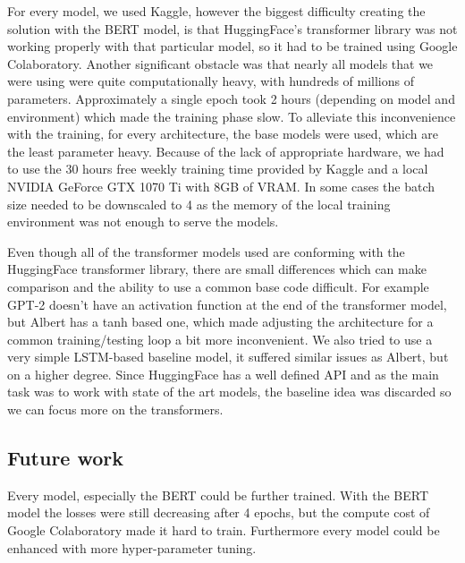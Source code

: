\documentclass[runningheads]{llncs}
\begin{document}
For every model, we used Kaggle, however the biggest difficulty creating the solution with the BERT model, is that HuggingFace's transformer library was not working properly with that particular model, so it had to be trained using Google Colaboratory. Another significant obstacle was that nearly all models that we were using were quite computationally heavy, with hundreds of millions of parameters. Approximately a single epoch took 2 hours (depending on model and environment) which made the training phase slow. To alleviate this inconvenience with the training, for every architecture, the base models were used, which are the least parameter heavy. Because of the lack of appropriate hardware, we had to use the 30 hours free weekly training time provided by Kaggle and a local NVIDIA GeForce GTX 1070 Ti with 8GB of VRAM. In some cases the batch size needed to be downscaled to 4 as the memory of the local training environment was not enough to serve the models.

Even though all of the transformer models used are conforming with the HuggingFace transformer library, there are small differences which can make comparison and the ability to use a common base code difficult. For example GPT-2 doesn't have an activation function at the end of the transformer model, but Albert has a tanh based one, which made adjusting the architecture for a common training/testing loop a bit more inconvenient. We also tried to use a very simple LSTM-based baseline model, it suffered similar issues as Albert, but on a higher degree. Since HuggingFace has a well defined API and as the main task was to work with state of the art models, the baseline idea was discarded so we can focus more on the transformers.

\subsection{Future work}

Every model, especially the BERT could be further trained. With the BERT model the losses were still decreasing after 4 epochs, but the compute cost of Google Colaboratory made it hard to train. Furthermore every model could be enhanced with more hyper-parameter tuning.



\end{document}
